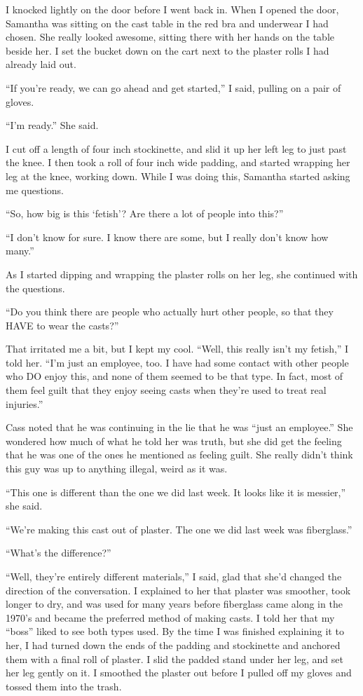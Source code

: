 I knocked lightly on the door before I went back in. When I opened the door, Samantha was
sitting on the cast table in the red bra and underwear I had chosen. She really looked awesome,
sitting there with her hands on the table beside her. I set the bucket down on the cart next to
the plaster rolls I had already laid out.

``If you're ready, we can go ahead and get started,'' I said, pulling on a pair of gloves.

``I'm ready.'' She said.

I cut off a length of four inch stockinette, and slid it up her left leg to just past the
knee. I then took a roll of four inch wide padding, and started wrapping her leg at the knee,
working down. While I was doing this, Samantha started asking me questions.

``So, how big is this ‘fetish'? Are there a lot of people into this?''

``I don't know for sure. I know there are some, but I really don't know how many.''

As I started dipping and wrapping the plaster rolls on her leg, she continued with the
questions.

``Do you think there are people who actually hurt other people, so that they HAVE to wear
the casts?''

That irritated me a bit, but I kept my cool. ``Well, this really isn't my fetish,'' I told
her. ``I'm just an employee, too. I have had some contact with other people who DO enjoy this,
and none of them seemed to be that type. In fact, most of them feel guilt that they enjoy seeing
casts when they're used to treat real injuries.''

Cass noted that he was continuing in the lie that he was ``just an employee.'' She
wondered
how much of what he told her was truth, but she did get the feeling that he was one of the ones
he mentioned as feeling guilt. She really didn't think this guy was up to anything illegal,
weird as it was.

``This one is different than the one we did last week. It looks like it is messier,'' she
said.

``We're making this cast out of plaster. The one we did last week was fiberglass.''

``What's the difference?''

``Well, they're entirely different materials,'' I said, glad that she'd changed the
direction of the conversation. I explained to her that plaster was smoother, took longer to dry,
and was used for many years before fiberglass came along in the 1970's and became the preferred
method of making casts. I told her that my ``boss'' liked to see both types used. By the time I
was finished explaining it to her, I had turned down the ends of the padding and stockinette and
anchored them with a final roll of plaster. I slid the padded stand under her leg, and set her
leg gently on it. I smoothed the plaster out before I pulled off my gloves and tossed them into
the trash.

